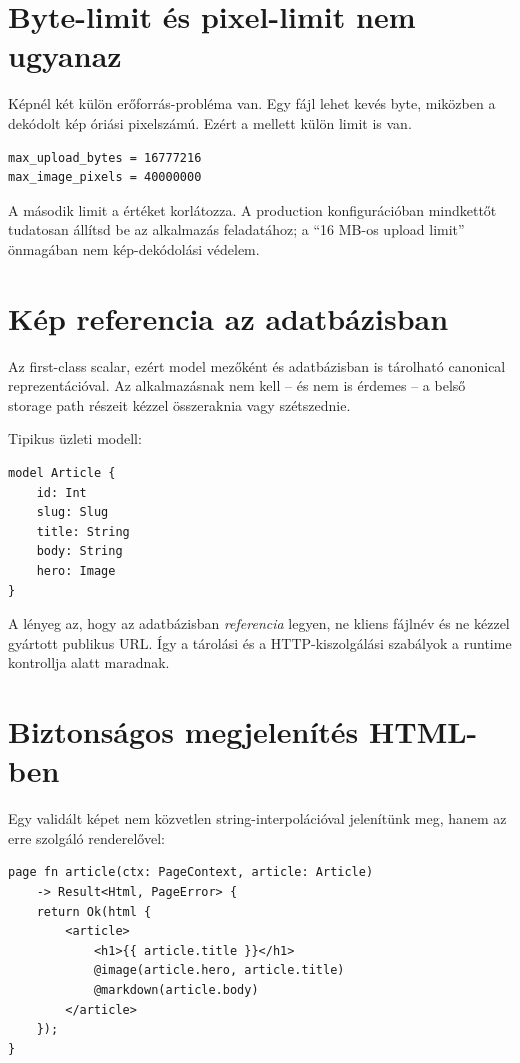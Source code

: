 \section{Byte-limit és pixel-limit nem ugyanaz}

Képnél két külön erőforrás-probléma van. Egy fájl lehet kevés byte, miközben a dekódolt kép óriási pixelszámú. Ezért a  mellett külön  limit is van.

\begin{lstlisting}
max_upload_bytes = 16777216
max_image_pixels = 40000000
\end{lstlisting}

A második limit a  értéket korlátozza. A production konfigurációban mindkettőt tudatosan állítsd be az alkalmazás feladatához; a ``16 MB-os upload limit'' önmagában nem kép-dekódolási védelem.

\section{Kép referencia az adatbázisban}

Az  first-class scalar, ezért model mezőként és adatbázisban is tárolható canonical reprezentációval. Az alkalmazásnak nem kell -- és nem is érdemes -- a belső storage path részeit kézzel összeraknia vagy szétszednie.

Tipikus üzleti modell:

\begin{lstlisting}[language=RWLang]
model Article {
    id: Int
    slug: Slug
    title: String
    body: String
    hero: Image
}
\end{lstlisting}

A lényeg az, hogy az adatbázisban \emph{referencia} legyen, ne kliens fájlnév és ne kézzel gyártott publikus URL. Így a tárolási és a HTTP-kiszolgálási szabályok a runtime kontrollja alatt maradnak.

\newpage
\section{Biztonságos megjelenítés HTML-ben}

Egy validált képet nem közvetlen string-interpolációval jelenítünk meg, hanem az erre szolgáló renderelővel:

\begin{lstlisting}[language=RWLang]
page fn article(ctx: PageContext, article: Article)
    -> Result<Html, PageError> {
    return Ok(html {
        <article>
            <h1>{{ article.title }}</h1>
            @image(article.hero, article.title)
            @markdown(article.body)
        </article>
    });
}
\end{lstlisting}

